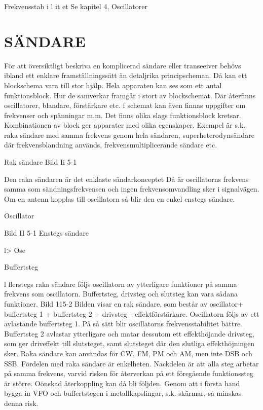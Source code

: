 \documentclass[a4paper,twoside,twocolumn,openright]{book}
\begin{document}
{{{Frekvensstab i l it et
Se kapitel 4, Oscillatorer


\chapter{SÄNDARE}

För att översiktligt beskriva en komplicerad
sändare eller transeeiver behövs ibland ett
enklare framställningssätt än detaljrika
principscheman. Då kan ett blockschema
vara till stor hjälp.
Hela apparaten kan ses som ett antal
funktionsblock. Hur de samverkar framgår i
stort av blockschemat. Där återfinns oscillatorer, blandare, förstärkare etc. f schemat
kan även finnas uppgifter om frekvenser
och spänningar m.m.
Det finns olika slags funktionsblock kretsar. Kombinationen av block ger apparater med olika egenskaper. Exempel är
s.k. raka sändare med samma frekvens
genom hela sändaren, superheterodynsändare där frekvensblandning används,
frekvensmultiplicerande sändare etc.

Rak sändare
Bild Ii 5-1

Den raka sändaren är det enklaste sändarkonceptet Då är oscillatorns frekvens samma som sändningsfrekvensen och ingen
frekvensomvandling sker i signalvägen. Om
en antenn kopplas till oscillatorn så blir den
en enkel enstegs sändare.

Oscillator

Bild II 5-1 Enstegs sändare

l>
Ose

Buffertsteg

l flerstegs raka sändare följs oscillatorn
av ytterligare funktioner på samma frekvens
som oscillatorn. Buffertsteg, drivsteg och
slutsteg kan vara sådana funktioner.
Bild 115-2
Bilden visar en rak sändare, som består
av oscillator+ buffertsteg 1 + buffertsteg 2 +
drivsteg +effektförstärkare.
Oscillatorn följs av ett avlastande buffertsteg 1. På så sätt blir oscillatorns frekvensstabilitet bättre. Buffertsteg 2 avlastar
ytterligare och matar dessutom ett effekthöjande drivsteg, som ger driveffekt till
slutsteget, samt slutsteget där den slutliga
effekthöjningen sker.
Raka sändare kan användas för CW,
FM, PM och AM, men inte DSB och SSB.
Fördelen med raka sändare är enkelheten.
Nackdelen är att alla steg arbetar på samma
frekvens, varvid risken för återverkan på ett
föregående funktionssteg är större. Oönskad återkoppling kan då bli följden. Genom
att i första hand bygga in VFO och buffertstegen i metallkapslingar, s.k. skärmar, så
minskas denna risk.

}}}
\end{document}

